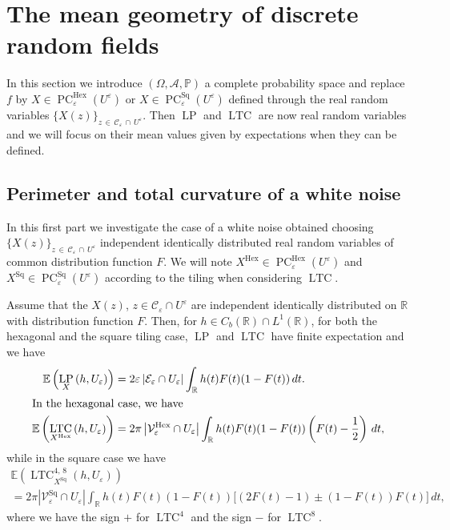 \documentclass[10pt]{amsart}
\theoremstyle{definition}\newtheorem{defi}[theo]{Definition}\newtheorem{rema}[theo]{Remark}\newtheorem{exam}[theo]{Example}\newtheorem{exem}[theo]{Example}\newtheorem{nota}[theo]{Notation}
\newcommand{\R}{\mathbb{R}}
\newcommand{\bbP}{\mathbb{P}}
\newcommand{\E}{\mathbb{E}}
\newcommand{\eps}{\varepsilon}
\DeclareMathOperator{\LTC}{LTC}
\DeclareMathOperator{\LP}{LP}
\DeclareMathOperator{\PC}{PC}
\DeclareMathOperator{\Hex}{Hex}
\DeclareMathOperator{\Sq}{Sq}
\newcommand{\calC}{\mathcal{C}}
\newcommand{\calV}{\mathcal{V}}
\newcommand{\calE}{\mathcal{E}}
\newcommand{\calA}{\mathcal{A}}
\begin{document}
\section{The mean geometry of discrete random fields}\label{MGoDRM:sec}
In this section we introduce $(\Omega, {\calA},\bbP)$ a complete probability space and replace $f$ by $X\in\PC^{\Hex}_\eps(U^{\eps})$ or $X\in\PC^{\Sq}_\eps(U^{\eps})$ defined through the real random variables $\{X(z)\}_{z\,\in\,\calC_\eps\,\cap\,U^{\eps}}$. Then $\LP$ and $\LTC$ are now real random variables and we will focus on their mean values given by expectations when they can be defined.

\subsection{Perimeter and total curvature of a white noise}
In this first part we investigate the case of a white noise obtained choosing $\{X(z)\}_{z\,\in\,\calC_\eps\,\cap\,U^{\eps}}$ independent identically distributed real random variables of common distribution function $F$. We will note $X^{\Hex}\in\PC^{\Hex}_\eps(U^{\eps})$ and $X^{\Sq}\in\PC^{\Sq}_\eps(U^{\eps})$ according to the tiling when considering $\LTC$.
\pagebreak
\begin{prop}
Assume that the $X(z)$, $z\in\calC_\eps\cap U^{\eps}$ are independent identically distributed on $\R$ with distribution function $F$. Then, for $h\in C_b(\R)\cap L^1(\R)$, for both the hexagonal and the square tiling case, $\LP$ and $\LTC$ have finite expectation and we have
\begin{align*}
\E\left(\LP_X\left(h,U_\eps\right)\right) &= 2\eps \left|\calE_\eps\cap U_\eps\right| \int_\R h(t) F(t) (1-
F(t)) \, dt.
\\
\intertext{In the hexagonal case, we have}
\E\left(\LTC_{X^{\Hex}}\left(h,U_\eps\right)\right) &= 2\pi \left|\calV_\eps^{\Hex}\cap U_\eps\right| \int_\R h(t) F(t) (1- F(t)) \left(F(t) -
\frac{1}{2}\right) \,dt,
\end{align*}
while in the square case we have
\begin{multline*}
\E\left(\LTC_{{X^{\Sq}}}^{4,\,8}(h,U_\eps)\right) \\
= 2\pi \left|\calV_\eps^{\Sq}\cap U_\eps\right| \int_\R h(t) F(t)
(1- F(t)) \big[(2F(t) - 1) \pm (1-F(t))F(t)\big] \,dt,
\end{multline*}
where we have the sign $+$ for $\LTC^4$ and the sign $-$ for $\LTC^8$.
\end{prop}
\end{document}
